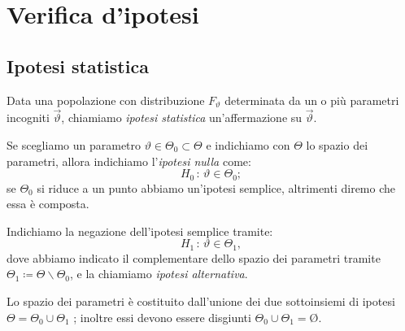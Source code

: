 
\chapter{Verifica d'ipotesi}
    \section{Ipotesi statistica}
        \begin{defn}
            Data una popolazione con distribuzione $F_\vartheta$ determinata da un o più  parametri 
            incogniti $\vec{\vartheta}$, chiamiamo \emph{ipotesi statistica} un'affermazione 
            su $\vec{\vartheta}$.

            Se scegliamo un parametro $\vartheta \in \Theta_0 \subset \Theta$ e indichiamo con $\Theta$ lo spazio dei 
            parametri, allora indichiamo l'\emph{ipotesi nulla} come: \[
                H_0 \,:\, \vartheta \in \Theta_0
            ;\] se $\Theta_0$ si riduce a un punto abbiamo un'ipotesi semplice, altrimenti diremo che essa 
            è composta.

            Indichiamo la negazione dell'ipotesi semplice tramite: \[
                H_1 \,:\, \vartheta \in \Theta_1
            ,\] dove abbiamo indicato il complementare dello spazio dei parametri tramite 
            $\Theta_1 \coloneqq \Theta\backslash \Theta_0$, e la chiamiamo \emph{ipotesi alternativa}.
        \end{defn}
        \begin{obsv}
            Lo spazio dei parametri è costituito dall'unione dei due sottoinsiemi di ipotesi 
            $\Theta = \Theta_0 \cup \Theta_1$ ; inoltre essi devono essere disgiunti $\Theta_0 \cup \Theta_1 = \text{\O}$.
        \end{obsv}

